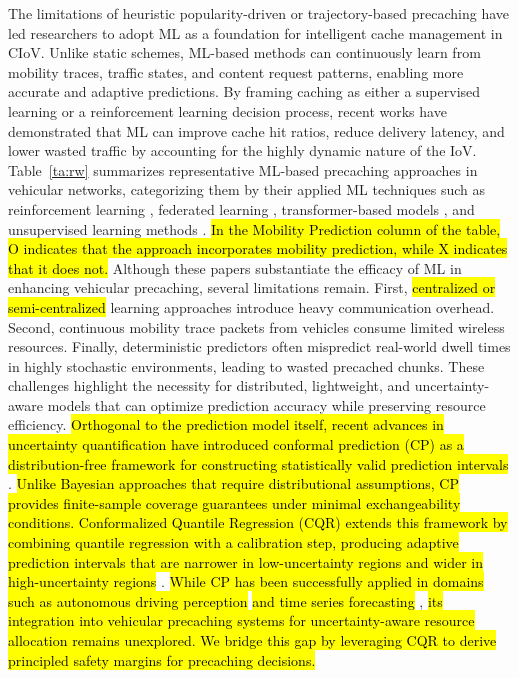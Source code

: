 \documentclass[journal]{IEEEtran}
\begin{document}
The limitations of heuristic popularity-driven or trajectory-based precaching have led researchers to adopt ML as a foundation for intelligent cache management in CIoV.
Unlike static schemes, ML-based methods can continuously learn from mobility traces, traffic states, and content request patterns, enabling more accurate and adaptive predictions.
By framing caching as either a supervised learning or a reinforcement learning decision process, recent works have demonstrated that ML can improve cache hit ratios, reduce delivery latency, and lower wasted traffic by accounting for the highly dynamic nature of the IoV.
Table~\ref{ta:rw} summarizes representative ML-based precaching approaches in vehicular networks, categorizing them by their applied ML techniques such as reinforcement learning \cite{Wang2023, Elsayed2022}, federated learning \cite{Jiang2024, Maale2023, Khanal2022}, transformer-based models \cite{Wang2025}, and unsupervised learning methods \cite{Zhang2024}.
\hl{In the Mobility Prediction column of the table, O indicates that the approach incorporates mobility prediction, while X indicates that it does not.}
Although these papers substantiate the efficacy of ML in enhancing vehicular precaching, several limitations remain.
First, \hl{centralized or semi-centralized} learning approaches introduce heavy communication overhead.
Second, continuous mobility trace packets from vehicles consume limited wireless resources.
Finally, deterministic predictors often mispredict real-world dwell times in highly stochastic environments, leading to wasted precached chunks.
These challenges highlight the necessity for distributed, lightweight, and uncertainty-aware models that can optimize prediction accuracy while preserving resource efficiency.
\hl{Orthogonal to the prediction model itself, recent advances in uncertainty quantification have introduced conformal prediction (CP) as a distribution-free framework for constructing statistically valid prediction intervals} \cite{x11}.
\hl{Unlike Bayesian approaches that require distributional assumptions, CP provides finite-sample coverage guarantees under minimal exchangeability conditions.
Conformalized Quantile Regression (CQR) extends this framework by combining quantile regression with a calibration step, producing adaptive prediction intervals that are narrower in low-uncertainty regions and wider in high-uncertainty regions} \cite{Angelopoulos2023}.
\hl{While CP has been successfully applied in domains such as autonomous driving perception} \cite{Lindemann2023} \hl{and time series forecasting} \cite{Zaffran2022}, \hl{its integration into vehicular precaching systems for uncertainty-aware resource allocation remains unexplored.
We bridge this gap by leveraging CQR to derive principled safety margins for precaching decisions.}
\end{document}
